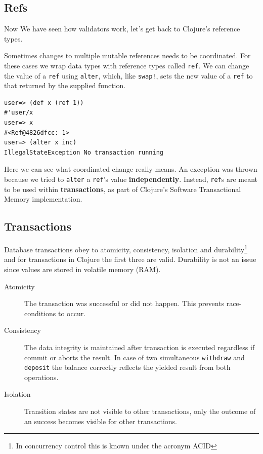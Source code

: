 \documentclass[a4paper,12pt]{kth-mag}
\begin{document}
\subsection{Refs}

Now We have seen how validators work, let's get back to Clojure's reference types.

Sometimes changes to multiple mutable references needs to be coordinated. For these cases we wrap data types with reference types called \texttt{ref}. We can change the value of a \texttt{ref} using \texttt{alter}, which, like \texttt{swap!}, sets the new value of a \texttt{ref} to that returned by the supplied function. 

\begin{listing}[H]
	\begin{verbatim}
user=> (def x (ref 1))
#'user/x
user=> x
#<Ref@4826dfcc: 1>
user=> (alter x inc)
IllegalStateException No transaction running
	\end{verbatim}
\end{listing}

Here we can see what coordinated change really means. An exception was thrown because we tried to \texttt{alter} a \texttt{ref}'s value \textbf{independently}. Instead, \texttt{ref}s are meant to be used within \textbf{transactions}, as part of Clojure's Software Transactional Memory implementation. 

\subsection{Transactions}
Database transactions obey to atomicity, consistency, isolation and durability\footnote{In concurrency control this is known under the acronym ACID} and for transactions in Clojure the first three are valid. Durability is not an issue since values are stored in volatile memory (RAM).

\begin{description}
    \item[Atomicity] The transaction was successful or did not happen. This prevents race-conditions to occur.
    \item[Consistency] The data integrity is maintained after transaction is executed regardless if commit or aborts the result. In case of two simultaneous \texttt{withdraw} and \texttt{deposit} the balance correctly reflects the yielded result from both operations.
    \item[Isolation] Transition states are not visible to other transactions, only the outcome of an success becomes visible for other transactions.
\end{description}
\end{document}
